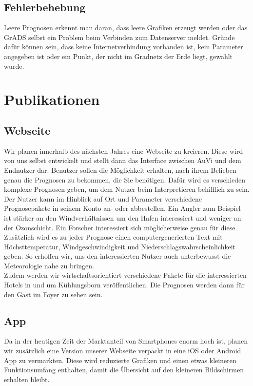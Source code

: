 \documentclass[a4paper,oneside,12pt,titlepage]{article}
\begin{document}
    \subsection{Fehlerbehebung}
        Leere Prognosen erkennt man daran, dass leere Grafiken erzeugt werden oder das GrADS selbst ein Problem beim Verbinden zum Datenserver meldet. Gründe dafür können sein, dass keine Internetverbindung vorhanden ist, kein Parameter angegeben ist oder ein Punkt, der nicht im Gradnetz der Erde liegt, gewählt wurde.

\newpage
\section{Publikationen}
    \subsection{Webseite}
        Wir planen innerhalb des nächsten Jahres eine Webseite zu kreieren. Diese wird von uns selbst entwickelt und stellt dann das Interface zwischen AuVi und dem Endnutzer dar. Benutzer sollen die Möglichkeit erhalten, nach ihrem Belieben genau die Prognosen zu bekommen, die Sie benötigen. Dafür wird es verschieden komplexe Prognosen geben, um dem Nutzer beim Interpretieren behilflich zu sein. Der Nutzer kann im Hinblick auf Ort und Parameter verschiedene Prognosepakete in seinem Konto an- oder abbestellen. Ein Angler zum Beispiel ist stärker an den Windverhältnissen um den Hafen interessiert und weniger an der Ozonschicht. Ein Forscher interessiert sich möglicherweise genau für diese.\\Zusätzlich wird es zu jeder Prognose einen computergenerierten Text mit Höchsttemperatur, Windgeschwindigkeit und Niederschlagswahrscheinlichkeit geben. So erhoffen wir, uns den interessierten Nutzer auch unterbewusst die Meteorologie nahe zu bringen.\\ Zudem werden wir wirtschaftsorientiert verschiedene Pakete für die interessierten Hotels in und um Kühlungsborn veröffentlichen. Die Prognosen werden dann für den Gast im Foyer zu sehen sein.

    \subsection{App}
        Da in der heutigen Zeit der Marktanteil von Smartphones enorm hoch ist, planen wir zusätzlich eine Version unserer Webseite verpackt in eine iOS oder Android App zu vermarkten. Diese wird reduzierte Grafiken und einen etwas kleineren Funktionsumfang enthalten, damit die Übersicht auf den kleineren Bildschirmen erhalten bleibt. 
\end{document}
